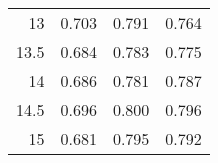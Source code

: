 \begin{table}[]
\begin{tabular}{rccc}
13   & \cellcolor[HTML]{F9A5A7}0.703 & \cellcolor[HTML]{C9E8D3}0.791 & \cellcolor[HTML]{D8EEE0}0.764 \\
13.5 & \cellcolor[HTML]{F87173}0.684 & \cellcolor[HTML]{EBF6F1}0.783 & \cellcolor[HTML]{B0DDBD}0.775 \\
14   & \cellcolor[HTML]{F87678}0.686 & \cellcolor[HTML]{F4F9F8}0.781 & \cellcolor[HTML]{84CC98}0.787 \\
14.5 & \cellcolor[HTML]{F99294}0.696 & \cellcolor[HTML]{A3D8B2}0.800 & \cellcolor[HTML]{63BE7B}0.796 \\
15   & \cellcolor[HTML]{F8696B}0.681 & \cellcolor[HTML]{B8E1C5}0.795 & \cellcolor[HTML]{72C488}0.792 \\ 
\bottomrule
\end{tabular}
\end{table}